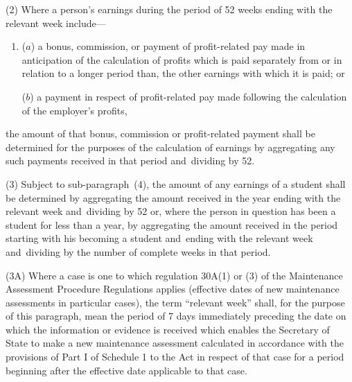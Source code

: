 \documentclass[12pt,a4paper]{article}
\begin{document}

(2) Where a person’s earnings during the period of 52 weeks ending with the relevant week include—
\begin{enumerate}\item[]
($a$) a bonus, commission, or payment of profit-related pay made in anticipation of the calculation of profits which is paid separately from or in relation to a longer period than, the other earnings with which it is paid; or

($b$) a payment in respect of profit-related pay made following the calculation of the employer’s profits,
\end{enumerate}
the amount of that bonus, commission or profit-related payment shall be determined for the purposes of the calculation of earnings by aggregating any such payments received in that period and~dividing by 52.

(3) Subject to sub-paragraph~(4), the amount of any earnings of a student shall be determined by aggregating the amount received in the year ending with the relevant week and~dividing by 52 or, where the person in question has been a student for less than a year, by aggregating the amount received in the period starting with his becoming a student and~ending with the relevant week and~dividing by the number of complete weeks in that period.

(3A) Where a case is one to which regulation 30A(1) or (3) of the Maintenance Assessment Procedure Regulations applies (effective dates of new maintenance assessments in particular cases), the term “relevant week” shall, for the purpose of this paragraph, mean the period of 7 days immediately preceding the date on which the information or evidence is received which enables 
the Secretary of State  %
to make a new maintenance assessment calculated in accordance with the provisions of Part I of Schedule 1 to the Act in respect of that case for a period beginning after the effective date applicable to that case.
\end{document}
